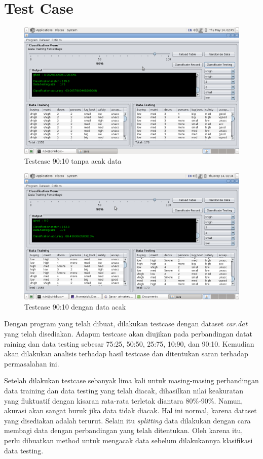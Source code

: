 \documentclass[11pt,a4paper]{report}
\begin{document}
	\section{Test Case}
	\begin{figure}[h]
	\centering
	\includegraphics[width=0.7\linewidth]{../results/9010-nonrandom}
	\caption{Testcase 90:10 tanpa acak data}
	\label{fig:9010-nonrandom}
	\end{figure}
	\begin{figure}[h]
		\centering
		\includegraphics[width=0.7\linewidth]{../results/9010-5}
		\caption{Testcase 90:10 dengan data acak}
		\label{fig:9010-5}
	\end{figure}
	
	Dengan program yang telah dibuat, dilakukan testcase dengan dataset \emph{car.dat} yang telah disediakan. Adapun testcase akan diujikan pada perbandingan datat raining dan data testing sebesar 75:25, 50:50, 25:75, 10:90, dan 90:10. Kemudian akan dilakukan analisis terhadap hasil testcase dan ditentukan saran terhadap permasalahan ini.
	
	Setelah dilakukan testcase sebanyak lima kali untuk masing-masing perbandingan data training dan data testing yang telah diacak, dihasilkan nilai keakuratan yang fluktuatif dengan kisaran rata-rata terletak diantara 80\%-90\%. Namun, akurasi akan sangat buruk jika data tidak diacak. Hal ini normal, karena dataset yang disediakan adalah terurut. Selain itu \emph{splitting} data dilakukan dengan cara membagi data dengan perbandingan yang telah ditentukan. Oleh karena itu, perlu dibuatkan method untuk mengacak data sebelum dilakukannya klasifikasi data testing.
\end{document}
